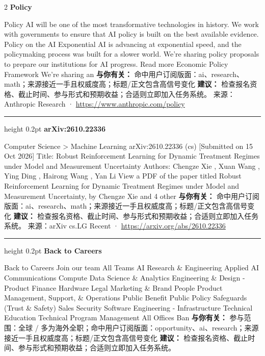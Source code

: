 \documentclass[10.5pt]{ctexart}
\begin{document}
\begin{multicols}{2}
{\large\bfseries Policy}\par
Policy AI will be one of the most transformative technologies in history. We work with governments to ensure that AI policy is built on the best available evidence. Policy on the AI Exponential AI is advancing at exponential speed, and the policymaking process was built for a slower world. We’re sharing policy proposals to prepare our institutions for AI progress. Read more Economic Policy Framework We’re sharing an 
\textbf{与你有关：} 命中用户订阅版面：ai、research、math；来源接近一手且权威度高；标题/正文包含高信号变化
\textbf{建议：} 检查报名资格、截止时间、参与形式和预期收益；合适则立即加入任务系统。
{\footnotesize\color{ormuted} 来源：Anthropic Research · \url{https://www.anthropic.com/policy}}
\vspace{2mm}
\hrule height 0.2pt
\vspace{2mm}
{\large\bfseries arXiv:2610.22336}\par
Computer Science > Machine Learning arXiv:2610.22336 (cs) [Submitted on 15 Oct 2026] Title: Robust Reinforcement Learning for Dynamic Treatment Regimes under Model and Measurement Uncertainty Authors: Chengze Xie , Xuan Wang , Ying Ding , Hairong Wang , Yan Li View a PDF of the paper titled Robust Reinforcement Learning for Dynamic Treatment Regimes under Model and Measurement Uncertainty, by Chengze Xie and 4 other 
\textbf{与你有关：} 命中用户订阅版面：ai、research、math；来源接近一手且权威度高；标题/正文包含高信号变化
\textbf{建议：} 检查报名资格、截止时间、参与形式和预期收益；合适则立即加入任务系统。
{\footnotesize\color{ormuted} 来源：arXiv cs.LG Recent · \url{https://arxiv.org/abs/2610.22336}}
\vspace{2mm}
\hrule height 0.2pt
\vspace{2mm}
{\large\bfseries Back to Careers}\par
Back to Careers Join our team All Teams AI Research \& Engineering Applied AI Communications Compute Data Science \& Analytics Engineering \& Design - Product Finance Hardware Legal Marketing \& Brand People Product Management, Support, \& Operations Public Benefit Public Policy Safeguards (Trust \& Safety) Sales Security Software Engineering - Infrastructure Technical Education Technical Program Management All Offices Ban
\textbf{与你有关：} 参与范围：全球 / 多为海外全职；命中用户订阅版面：opportunity、ai、research；来源接近一手且权威度高；标题/正文包含高信号变化
\textbf{建议：} 检查报名资格、截止时间、参与形式和预期收益；合适则立即加入任务系统。

\end{multicols}
\end{document}
